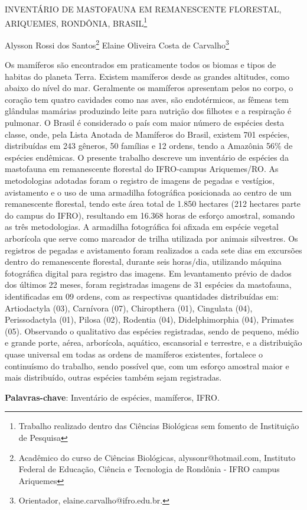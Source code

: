 \documentclass[article,12pt,onesidea,4paper,english,brazil]{abntex2}
\begin{document}
	
	
	\frenchspacing 
	
	\begin{center}
		\LARGE INVENTÁRIO DE MASTOFAUNA EM REMANESCENTE FLORESTAL,
		ARIQUEMES, RONDÔNIA, BRASIL\footnote{Trabalho realizado dentro das Ciências Biológicas sem fomento de Instituição de Pesquisa}
	
		\normalsize
	Alysson Rossi dos Santos\footnote{Acadêmico do curso de Ciências Biológicas, alyssonr@hotmail.com, Instituto Federal de Educação,
		Ciência e Tecnologia de Rondônia - IFRO campus Ariquemes} 
	Elaine Oliveira Costa de Carvalho\footnote{Orientador, elaine.carvalho@ifro.edu.br.}
	
	\end{center}
	
	\noindent Os mamíferos são encontrados em praticamente todos os biomas e tipos de habitas
	do planeta Terra. Existem mamíferos desde as grandes altitudes, como abaixo do
	nível do mar. Geralmente os mamíferos apresentam pelos no corpo, o coração tem
	quatro cavidades como nas aves, são endotérmicos, as fêmeas tem glândulas
	mamárias produzindo leite para nutrição dos filhotes e a respiração é pulmonar. O
	Brasil é considerado o país com maior número de espécies desta classe, onde, pela
	Lista Anotada de Mamíferos do Brasil, existem 701 espécies, distribuídas em 243
	gêneros, 50 famílias e 12 ordens, tendo a Amazônia 56\% de espécies endêmicas. O
	presente trabalho descreve um inventário de espécies da mastofauna em
	remanescente florestal do IFRO-campus Ariquemes/RO. As metodologias adotadas
	foram o registro de imagens de pegadas e vestígios, avistamento e o uso de uma
	armadilha fotográfica posicionada ao centro de um remanescente florestal, tendo
	este área total de 1.850 hectares (212 hectares parte do campus do IFRO),
	resultando em 16.368 horas de esforço amostral, somando as três metodologias. A
	armadilha fotográfica foi afixada em espécie vegetal arborícola que serve como
	marcador de trilha utilizada por animais silvestres. Os registros de pegadas e
	avistamento foram realizados a cada sete dias em excursões dentro do
	remanescente florestal, durante seis horas/dia, utilizando máquina fotográfica digital
	para registro das imagens. Em levantamento prévio de dados dos últimos 22 meses,
	foram registradas imagens de 31 espécies da mastofauna, identificadas em 09
	ordens, com as respectivas quantidades distribuídas em: Artiodactyla (03), Carnívora
	(07), Chiropthera (01), Cingulata (04), Perissodactyla (01), Pilosa (02), Rodentia (04),
	Didelphimorphia (04), Primates (05). Observando o qualitativo das espécies
	registradas, sendo de pequeno, médio e grande porte, aérea, arborícola, aquático,
	escansorial e terrestre, e a distribuição quase universal em todas as ordens de
	mamíferos existentes, fortalece o continuísmo do trabalho, sendo possível que, com
	um esforço amostral maior e mais distribuído, outras espécies também sejam
	registradas.
	
	\vspace{\onelineskip}
	
	\noindent
	\textbf{Palavras-chave}: Inventário de espécies, mamíferos, IFRO.
	
\end{document}

